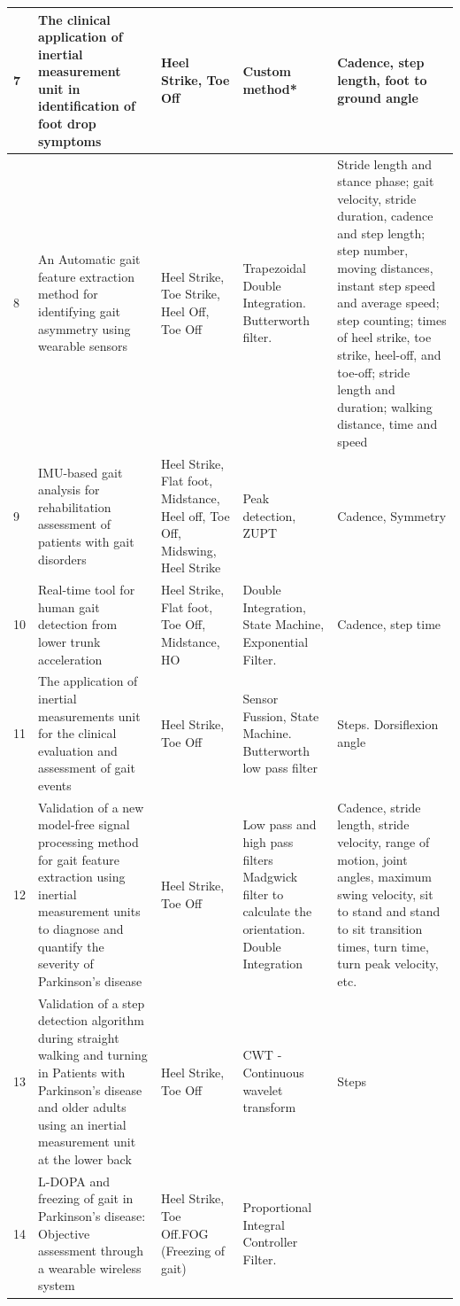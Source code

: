 {\begin{longtable}{|p{1cm}|p{4cm}|p{2.5cm}|p{3.5cm}|p{6cm}|}
7 & The clinical application of inertial measurement unit in identification of foot drop symptoms & Heel Strike, Toe Off & Custom method* & Cadence, step length, foot to ground angle \\ \hline
8 & An Automatic gait feature extraction method for identifying gait asymmetry using wearable sensors & Heel Strike, Toe Strike, Heel Off, Toe Off & Trapezoidal Double Integration. Butterworth filter. & Stride length and stance phase; gait velocity, stride duration, cadence and step length; step number, moving distances, instant step speed and average speed; step counting; times of heel strike, toe strike, heel-off, and toe-off; stride length and duration; walking distance, time and speed \\ \hline
9 & IMU-based gait analysis for rehabilitation assessment of patients with gait disorders & Heel Strike, Flat foot, Midstance, Heel off, Toe Off, Midswing, Heel Strike & Peak detection, ZUPT & Cadence, Symmetry \\ \hline
10 & Real-time tool for human gait detection from lower trunk acceleration & Heel Strike, Flat foot, Toe Off, Midstance, HO & Double Integration, State Machine, Exponential Filter. & Cadence, step time \\ \hline
11 & The application of inertial measurements unit for the clinical evaluation and assessment of gait events & Heel Strike, Toe Off & Sensor Fussion, State Machine.
Butterworth low pass filter & Steps. Dorsiflexion angle \\ \hline
12 & Validation of a new model-free signal processing method for gait feature extraction using inertial measurement units to diagnose and quantify the severity of Parkinson's disease & Heel Strike, Toe Off & Low pass and high pass filters
Madgwick filter to calculate the orientation.
Double Integration & Cadence, stride length, stride velocity, range of motion, joint angles, maximum swing velocity, sit to stand and stand to sit transition times, turn time, turn peak velocity, etc. \\ \hline
13 & Validation of a step detection algorithm during straight walking and turning in Patients with Parkinson's disease and older adults using an inertial measurement unit at the lower back & Heel Strike, Toe Off & CWT - Continuous wavelet transform & Steps \\ \hline
14 & L-DOPA and freezing of gait in Parkinson's disease: Objective assessment through a wearable wireless system & Heel Strike, Toe Off.FOG (Freezing of gait) & Proportional Integral Controller Filter.

\end{longtable}}

